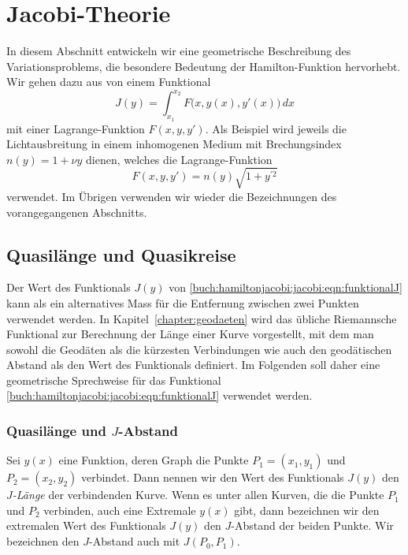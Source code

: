 %
%
%
\section{Jacobi-Theorie
\label{buch:hamiltonjacobi:section:jacobi}}

In diesem Abschnitt entwickeln wir eine geometrische Beschreibung des
Variationsproblems, die besondere Bedeutung der Hamilton-Funktion hervorhebt.
Wir gehen dazu aus von einem Funktional
\begin{equation}
J(y)
=
\int_{x_1}^{x_2}
F\bigl(x,y(x),y'(x)\bigr)
\,dx
\label{buch:hamiltonjacobi:jacobi:eqn:funktionalJ}
\end{equation}
mit einer Lagrange-Funktion $F(x,y,y')$.
Als Beispiel wird jeweils die Lichtausbreitung in einem inhomogenen
Medium mit Brechungsindex $n(y) = 1+\nu y$ dienen, welches die
Lagrange-Funktion
\begin{equation}
F(x,y,y')
=
n(y) \sqrt{1+y^{\prime 2}}
\label{buch:hamiltonjacobi:jacobi:eqn:beispielF}
\end{equation}
verwendet.
Im Übrigen verwenden wir wieder die Bezeichnungen des vorangegangenen
Abschnitts.

%
%
\subsection{Quasilänge und Quasikreise
\label{buch:hamiltonjacobi:jacobi:subsection:quasi}}
Der Wert des Funktionals $J(y)$ von
\eqref{buch:hamiltonjacobi:jacobi:eqn:funktionalJ}
kann als ein alternatives Mass für die Entfernung zwischen
zwei Punkten verwendet werden.
In Kapitel~\ref{chapter:geodaeten} wird das übliche Riemannsche
Funktional zur Berechnung der Länge einer Kurve vorgestellt, mit dem
man sowohl die Geodäten als die kürzesten Verbindungen wie auch
den geodätischen Abstand als den Wert des Funktionals definiert.
Im Folgenden soll daher eine geometrische Sprechweise für das Funktional 
\eqref{buch:hamiltonjacobi:jacobi:eqn:funktionalJ}
verwendet werden.

%
%
\subsubsection{Quasilänge und $J$-Abstand}
Sei $y(x)$ eine Funktion, deren Graph die Punkte $P_1=(x_1,y_1)$
und $P_2=(x_2,y_2)$ verbindet.
Dann nennen wir den Wert des Funktionals $J(y)$ den {\em $J$-Länge}
der verbindenden Kurve.
Wenn es unter allen Kurven, die die Punkte $P_1$  und $P_2$ verbinden,
auch eine Extremale $y(x)$ gibt, dann bezeichnen wir den extremalen
Wert des Funktionals $J(y)$ den $J$-Abstand der beiden Punkte.
Wir bezeichnen den $J$-Abstand auch mit $J(P_0,P_1)$.

